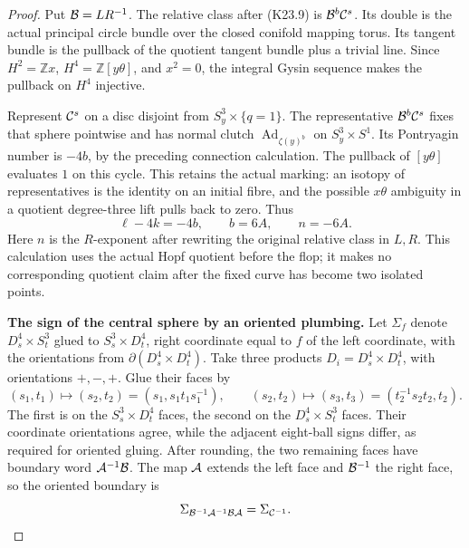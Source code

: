 \begin{proof}
Put \({\cal B}=LR^{-1}\). The relative class after (K23.9) is
\({\cal B}^b{\cal C}^s\). Its double is the actual principal circle
bundle over the closed conifold mapping torus. Its tangent bundle
is the pullback of the quotient tangent bundle plus a trivial
line. Since \(H^2=\mathbb Zx\), \(H^4=\mathbb Z[y\theta]\), and
\(x^2=0\), the integral Gysin sequence makes the pullback on \(H^4\)
injective.

Represent \({\cal C}^s\) on a disc disjoint from
\(S^3_y\times\{q=1\}\). The representative
\({\cal B}^b{\cal C}^s\) fixes that sphere pointwise and has
normal clutch \(\operatorname{Ad}_{\zeta(y)^b}\) on
\(S^3_y\times S^1\). Its Pontryagin number is \(-4b\), by the
preceding connection calculation. The pullback of \([y\theta]\)
evaluates \(1\) on this cycle. This retains the actual marking:
an isotopy of representatives is the identity on an initial fibre,
and the possible \(x\theta\) ambiguity in a quotient degree-three
lift pulls back to zero. Thus
\[
 \ell-4k=-4b,\qquad b=6A,\qquad n=-6A.              \tag{K23.10}
\]
Here \(n\) is the \(R\)-exponent after rewriting the original
relative class in \(L,R\). This calculation uses the actual Hopf
quotient before the flop; it makes no corresponding quotient claim
after the fixed curve has become two isolated points.

\par\medskip\noindent\textbf{The sign of the central sphere by an oriented plumbing.}\enspace
Let \(\Sigma_f\) denote \(D^4_s\times S^3_t\) glued to
\(S^3_s\times D^4_t\), right coordinate equal to \(f\) of the left
coordinate, with the orientations from
\(\partial(D^4_s\times D^4_t)\). Take three products
\(D_i=D^4_s\times D^4_t\), with orientations \(+,-,+\).
Glue their faces by
\[
 (s_1,t_1)\longmapsto(s_2,t_2)
       =(s_1,s_1t_1s_1^{-1}),\qquad
 (s_2,t_2)\longmapsto(s_3,t_3)
       =(t_2^{-1}s_2t_2,t_2).
\]
The first is on the \(S^3_s\times D^4_t\) faces, the second on the
\(D^4_s\times S^3_t\) faces. Their coordinate orientations agree,
while the adjacent eight-ball signs differ, as required for oriented
gluing. After rounding, the two remaining faces have boundary word
\({\cal A}^{-1}{\cal B}\). The map \({\cal A}\) extends the left
face and \({\cal B}^{-1}\) the right face, so the oriented boundary is
\[
 \Sigma_{{\cal B}^{-1}{\cal A}^{-1}{\cal B}{\cal A}}
                       =\Sigma_{{\cal C}^{-1}}.
\]


\end{proof}
